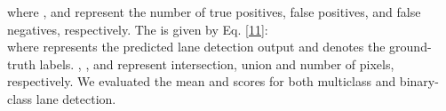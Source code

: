 \documentclass[journal]{IEEEtran}
\begin{document}
where ,  and  represent the number of true positives, false positives, and false negatives, respectively. The  is given by Eq. \ref{11}: \\

where  represents the predicted lane detection output and  denotes the ground-truth labels. , , and  represent
intersection, union and number of pixels, respectively. We evaluated the mean  and  scores for both multiclass and binary-class lane detection.

\begin{table}[t]
\centering
\caption{Comparison of evaluation results of LDNet with other state-of-the-art methods on the DET dataset. The mean  scores () and mean s () are used as evaluation metrics for the multiclass labels. The values in bold are the best scores.}
\label{table 1}
\end{table}
\end{document}
